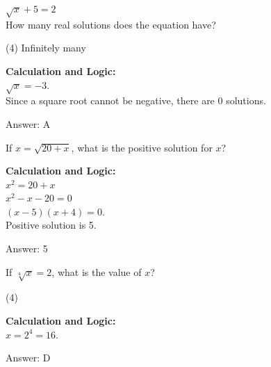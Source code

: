 \documentclass[11pt,paper=a4,answers]{exam}
\begin{document}
\begin{questions}
\question
$\sqrt{x} + 5 = 2$ \\
How many real solutions does the equation have?
\begin{tasks}(4)
    \task Infinitely many
\end{tasks}

\begin{solution}
\textbf{Calculation and Logic:} \\
$\sqrt{x} = -3$. \\
Since a square root cannot be negative, there are 0 solutions.

\vspace{25pt}

Answer: \colorbox{yellow!100}{A}
\end{solution}

\vspace{40pt}

\question
If $x = \sqrt{20 + x}$, what is the positive solution for $x$?

\begin{solution}
\textbf{Calculation and Logic:} \\
$x^2 = 20 + x$ \\
$x^2 - x - 20 = 0$ \\
$(x - 5)(x + 4) = 0$. \\
Positive solution is 5.

\vspace{25pt}

Answer: \colorbox{yellow!100}{5}
\end{solution}

\vspace{40pt}

\question
If $\sqrt[4]{x} = 2$, what is the value of $x$?
\begin{tasks}(4)
\end{tasks}

\begin{solution}
\textbf{Calculation and Logic:} \\
$x = 2^4 = 16$.

\vspace{25pt}

Answer: \colorbox{yellow!100}{D}
\end{solution}


\end{questions}
\end{document}
